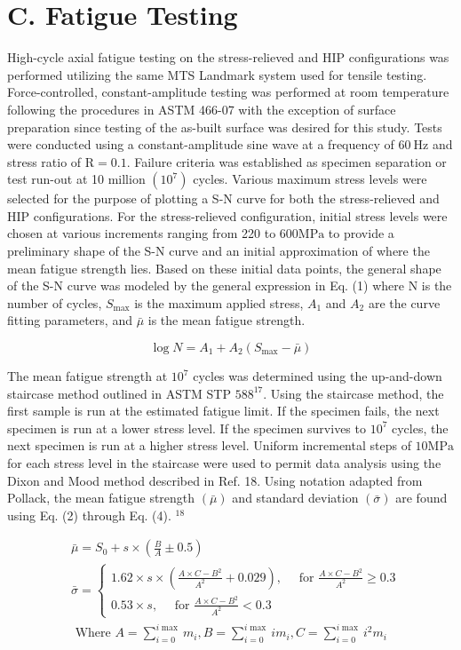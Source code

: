 \documentclass[10pt]{article}
\begin{document}
\section*{C. Fatigue Testing}
High-cycle axial fatigue testing on the stress-relieved and HIP configurations was performed utilizing the same MTS Landmark system used for tensile testing. Force-controlled, constant-amplitude testing was performed at room temperature following the procedures in ASTM 466-07 with the exception of surface preparation since testing of the as-built surface was desired for this study. Tests were conducted using a constant-amplitude sine wave at a frequency of $60 \mathrm{~Hz}$ and stress ratio of $\mathrm{R}=0.1$. Failure criteria was established as specimen separation or test run-out at 10 million $\left(10^{7}\right)$ cycles. Various maximum stress levels were selected for the purpose of plotting a S-N curve for both the stress-relieved and HIP configurations. For the stress-relieved configuration, initial stress levels were chosen at various increments ranging from 220 to $600 \mathrm{MPa}$ to provide a preliminary shape of the S-N curve and an initial approximation of where the mean fatigue strength lies. Based on these initial data points, the general shape of the S-N curve was modeled by the general expression in Eq. (1) where $\mathrm{N}$ is the number of cycles, $S_{\max }$ is the maximum applied stress, $A_{1}$ and $A_{2}$ are the curve fitting parameters, and $\bar{\mu}$ is the mean fatigue strength.


\begin{equation*}
\log N=A_{1}+A_{2}\left(S_{\max }-\bar{\mu}\right) \tag{1}
\end{equation*}


The mean fatigue strength at $10^{7}$ cycles was determined using the up-and-down staircase method outlined in ASTM STP $588^{17}$. Using the staircase method, the first sample is run at the estimated fatigue limit. If the specimen fails, the next specimen is run at a lower stress level. If the specimen survives to $10^{7}$ cycles, the next specimen is run at a higher stress level. Uniform incremental steps of $10 \mathrm{MPa}$ for each stress level in the staircase were used to permit data analysis using the Dixon and Mood method described in Ref. 18. Using notation adapted from Pollack, the mean fatigue strength $(\bar{\mu})$ and standard deviation $(\bar{\sigma})$ are found using Eq. (2) through Eq. (4). ${ }^{18}$

$$
\begin{aligned}
& \bar{\mu}=S_{0}+s \times\left(\frac{B}{A} \pm 0.5\right) \\
& \bar{\sigma}=\left\{\begin{array}{l}
1.62 \times s \times\left(\frac{A \times C-B^{2}}{A^{2}}+0.029\right), \quad \text { for } \frac{A \times C-B^{2}}{A^{2}} \geq 0.3 \\
0.53 \times s, \quad \text { for } \frac{A \times C-B^{2}}{A^{2}}<0.3
\end{array}\right. \\
& \text { Where } A=\sum_{i=0}^{i \max } m_{i}, B=\sum_{i=0}^{i \max } i m_{i}, C=\sum_{i=0}^{i \max } i^{2} m_{i}
\end{aligned}
$$
\end{document}
